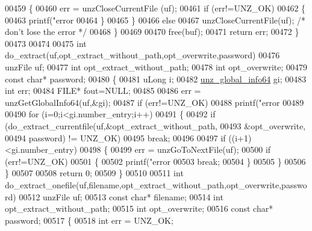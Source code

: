 \begin{DoxyCode}
{{{{{{{{{{{{{{{{00459         \{
00460             err = unzCloseCurrentFile (uf);
00461             \textcolor{keywordflow}{if} (err!=UNZ\_OK)
00462             \{
00463                 printf(\textcolor{stringliteral}{"error %
00464             \}
00465         \}
00466         \textcolor{keywordflow}{else}
00467             unzCloseCurrentFile(uf); \textcolor{comment}{/* don't lose the error */}
00468     \}
00469 
00470     free(buf);
00471     \textcolor{keywordflow}{return} err;
00472 \}
00473 
00474 
00475 \textcolor{keywordtype}{int} do\_extract(uf,opt\_extract\_without\_path,opt\_overwrite,password)
00476     unzFile uf;
00477     \textcolor{keywordtype}{int} opt\_extract\_without\_path;
00478     \textcolor{keywordtype}{int} opt\_overwrite;
00479     \textcolor{keyword}{const} \textcolor{keywordtype}{char}* password;
00480 \{
00481     uLong i;
00482     \hyperlink{structunz__global__info64__s}{unz\_global\_info64} gi;
00483     \textcolor{keywordtype}{int} err;
00484     FILE* fout=NULL;
00485 
00486     err = unzGetGlobalInfo64(uf,&gi);
00487     \textcolor{keywordflow}{if} (err!=UNZ\_OK)
00488         printf(\textcolor{stringliteral}{"error %
00489 
00490     \textcolor{keywordflow}{for} (i=0;i<gi.number\_entry;i++)
00491     \{
00492         \textcolor{keywordflow}{if} (do\_extract\_currentfile(uf,&opt\_extract\_without\_path,
00493                                       &opt\_overwrite,
00494                                       password) != UNZ\_OK)
00495             \textcolor{keywordflow}{break};
00496 
00497         \textcolor{keywordflow}{if} ((i+1)<gi.number\_entry)
00498         \{
00499             err = unzGoToNextFile(uf);
00500             \textcolor{keywordflow}{if} (err!=UNZ\_OK)
00501             \{
00502                 printf(\textcolor{stringliteral}{"error %
00503                 \textcolor{keywordflow}{break};
00504             \}
00505         \}
00506     \}
00507 
00508     \textcolor{keywordflow}{return} 0;
00509 \}
00510 
00511 \textcolor{keywordtype}{int} do\_extract\_onefile(uf,filename,opt\_extract\_without\_path,opt\_overwrite,password)
00512     unzFile uf;
00513     \textcolor{keyword}{const} \textcolor{keywordtype}{char}* filename;
00514     \textcolor{keywordtype}{int} opt\_extract\_without\_path;
00515     \textcolor{keywordtype}{int} opt\_overwrite;
00516     \textcolor{keyword}{const} \textcolor{keywordtype}{char}* password;
00517 \{
00518     \textcolor{keywordtype}{int} err = UNZ\_OK;
}}}}}}}}}}}}}}}}}}}
\end{DoxyCode}
